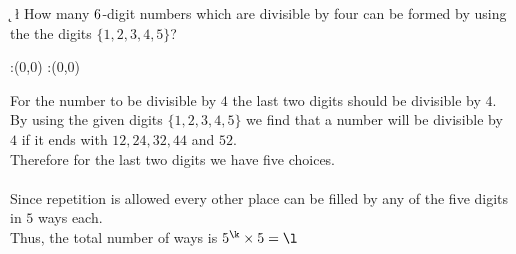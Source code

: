 


\SUBTRACT{}\k
{}\m
\MULTIPLY{}\l
\question How many $6$-digit numbers which are divisible by four can be formed by using the the digits $\lbrace1,2,3,4,5\rbrace$?


\watchout

\ifprintanswers
  \begin{marginfigure}
      :(0,0)
      :(0,0)
    \figdrawbegin{}
      \figdrawline [100,101]
    \figdrawend
    \figvisu{\figBoxA}{}{%
    }
    \centerline{\box\figBoxA}
  \end{marginfigure}
\fi 


\begin{solution}
For the number to be divisible by $4$ the last two digits should be divisible by $4$.\\
By using the given digits $\lbrace1,2,3,4,5\rbrace$ we find that a number will be divisible by $4$ if it ends with 
${12},{24},{32},{44}$ and ${52}$.\\ Therefore for the last two digits we have five choices.\\
\\
Since repetition is allowed every other place can be filled by any of the five digits in $5$ ways each.\\
Thus, the total number of ways is $5^{\k} \times 5 = \l$   
\end{solution}

